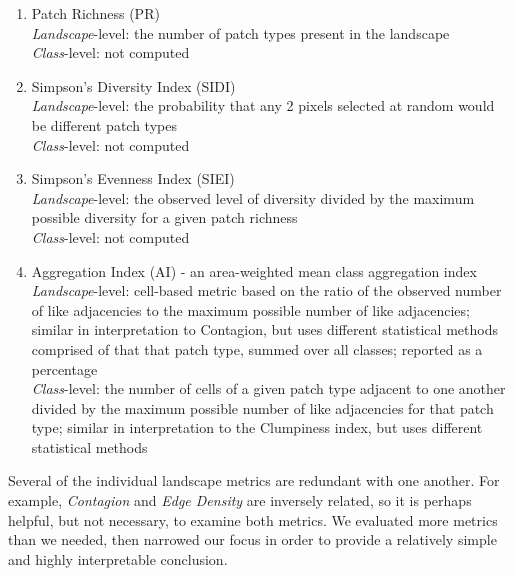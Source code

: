 \begin{enumerate}
	\item Patch Richness (PR)\\
	\emph{Landscape}-level: the number of patch types present in the landscape	\\
	\emph{Class}-level: not computed \\
	
	\item Simpson's Diversity Index (SIDI)\\
	\emph{Landscape}-level: the probability that any 2 pixels selected at random would be different patch types	\\
	\emph{Class}-level: not computed\\
	
	\item Simpson's Evenness Index (SIEI) \\
	\emph{Landscape}-level:  the observed level of diversity divided by the maximum possible diversity for a given patch richness 	\\
	\emph{Class}-level: not computed\\
	
	\item Aggregation Index (AI) - an area-weighted mean class aggregation index \\
	\emph{Landscape}-level: cell-based metric based on the ratio of the observed number of like adjacencies to the maximum possible number of like 
adjacencies; similar in interpretation to Contagion, but uses different statistical methods
comprised of that that patch type, summed over all classes; reported as a percentage	\\
	\emph{Class}-level: the number of cells of a given patch type adjacent to one another divided by the maximum possible number of like 
adjacencies for that patch type; similar in interpretation to the Clumpiness index, but uses different statistical methods	\\
\end{enumerate}

Several of the individual landscape metrics are redundant with one another. For example, \emph{Contagion} and \emph{Edge Density} are inversely related, so it is perhaps helpful, but not necessary, to examine both metrics. We evaluated more metrics than we needed, then narrowed our focus in order to provide a relatively simple and highly interpretable conclusion.